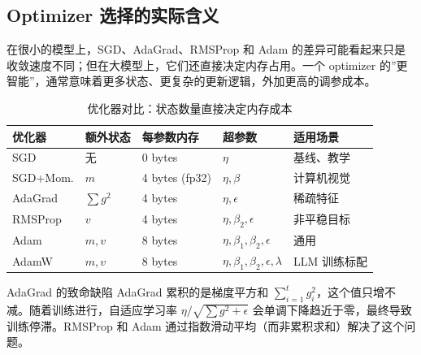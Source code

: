 \subsection{Optimizer 选择的实际含义}

在很小的模型上，SGD、AdaGrad、RMSProp 和 Adam 的差异可能看起来只是收敛速度不同；但在大模型上，它们还直接决定内存占用。一个 optimizer 的”更智能”，通常意味着更多状态、更复杂的更新逻辑，外加更高的调参成本。

\begin{table}[H]
\centering
\begin{tabular}{p{}p{}p{}p{}p{}}
\toprule
\textbf{优化器} & \textbf{额外状态} & \textbf{每参数内存} & \textbf{超参数} & \textbf{适用场景} \\
\midrule
SGD & 无 & 0 bytes & $\eta$ & 基线、教学 \\
SGD+Mom. & $m$ & 4 bytes (fp32) & $\eta, \beta$ & 计算机视觉 \\
AdaGrad & $\sum g^2$ & 4 bytes & $\eta, \epsilon$ & 稀疏特征 \\
RMSProp & $v$ & 4 bytes & $\eta, \beta_2, \epsilon$ & 非平稳目标 \\
Adam & $m, v$ & 8 bytes & $\eta, \beta_1, \beta_2, \epsilon$ & 通用 \\
AdamW & $m, v$ & 8 bytes & $\eta, \beta_1, \beta_2, \epsilon, \lambda$ & LLM 训练标配 \\
\bottomrule
\end{tabular}
\caption{优化器对比：状态数量直接决定内存成本}
\end{table}

\begin{warningbox}{AdaGrad 的致命缺陷}
AdaGrad 累积的是梯度平方和 $\sum_{i=1}^{t} g_i^2$，这个值只增不减。随着训练进行，自适应学习率 $\eta / \sqrt{\sum g^2 + \epsilon}$ 会单调下降趋近于零，最终导致训练停滞。RMSProp 和 Adam 通过指数滑动平均（而非累积求和）解决了这个问题。
\end{warningbox}


